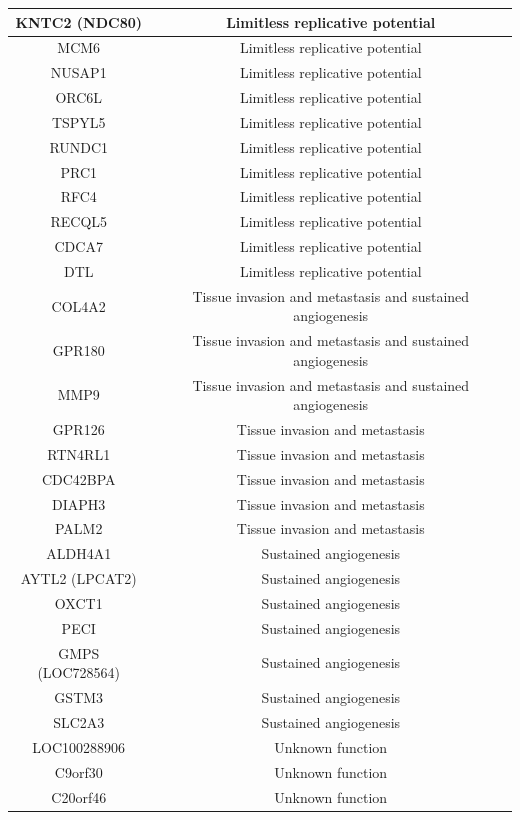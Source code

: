 {\begin{longtable}[!htb]{|c|c|}
\hline
KNTC2 (NDC80) & Limitless replicative potential \\ 
\hline 
MCM6 & Limitless replicative potential \\  
\hline
NUSAP1 & Limitless replicative potential \\  
\hline
ORC6L & Limitless replicative potential \\  
\hline
TSPYL5 & Limitless replicative potential \\  
\hline
RUNDC1 & Limitless replicative potential \\  
\hline
PRC1 & Limitless replicative potential \\  
\hline
RFC4 & Limitless replicative potential \\  
\hline
RECQL5 & Limitless replicative potential \\ 
\hline
CDCA7 & Limitless replicative potential \\ 
\hline
DTL & Limitless replicative potential \\ 
\hline
COL4A2 & Tissue invasion and metastasis and sustained angiogenesis \\
\hline
GPR180 & Tissue invasion and metastasis and sustained angiogenesis \\
\hline
MMP9 & Tissue invasion and metastasis and sustained angiogenesis\\
\hline
GPR126 & Tissue invasion and metastasis \\
\hline
RTN4RL1 & Tissue invasion and metastasis \\
\hline
CDC42BPA & Tissue invasion and metastasis \\
\hline
DIAPH3 & Tissue invasion and metastasis \\
\hline
PALM2 & Tissue invasion and metastasis \\
\hline
ALDH4A1 & Sustained angiogenesis \\
\hline
AYTL2 (LPCAT2) & Sustained angiogenesis \\
\hline
OXCT1 & Sustained angiogenesis \\
\hline
PECI & Sustained angiogenesis \\
\hline
GMPS (LOC728564) & Sustained angiogenesis \\
\hline
GSTM3 & Sustained angiogenesis \\
\hline
SLC2A3 & Sustained angiogenesis \\
\hline
LOC100288906 & Unknown function \\
\hline
C9orf30 & Unknown function \\
\hline
C20orf46 & Unknown function \\

\end{longtable}}
